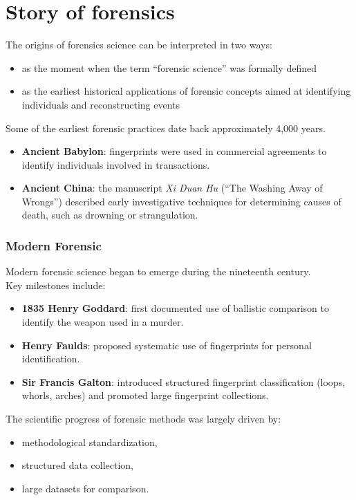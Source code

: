 
\section{Story of forensics}

The origins of forensics science can be interpreted in two ways:
\begin{itemize}
  \item as the moment when the term ``forensic science'' was formally defined
  \item as the earliest historical applications of forensic concepts aimed at identifying individuals and reconstructing events
\end{itemize}

\noindent
Some of the earliest forensic practices date back approximately 4,000 years.

\begin{itemize}
\item \textbf{Ancient Babylon}: fingerprints were used in commercial agreements to identify individuals involved in transactions.
\item \textbf{Ancient China}: the manuscript \emph{Xi Duan Hu} (``The Washing Away of Wrongs'') described early investigative techniques for determining causes of death, such as drowning or strangulation.
\end{itemize}


\subsubsection {Modern Forensic }

Modern forensic science began to emerge during the nineteenth century.\\
Key milestones include:

\begin{itemize}
\item \textbf{1835 Henry Goddard}: first documented use of ballistic comparison to identify the weapon used in a murder.
\item \textbf{Henry Faulds}: proposed systematic use of fingerprints for personal identification.
\item \textbf{Sir Francis Galton}: introduced structured fingerprint classification (loops, whorls, arches) and promoted large fingerprint collections.
\end{itemize}

\noindent
The scientific progress of forensic methods was largely driven by:
\begin{itemize}
\item methodological standardization,
\item structured data collection,
\item large datasets for comparison.
\end{itemize}


